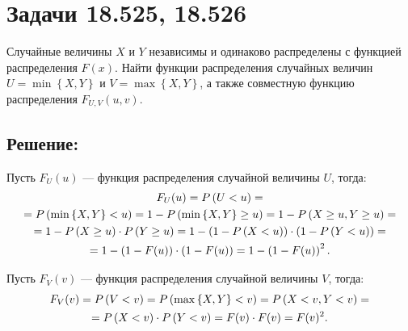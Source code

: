 \section*{Задачи 18.525, 18.526}

Случайные величины $X$ и $Y$ независимы и одинаково распределены с функцией распределения $F(x)$. Найти функции распределения случайных величин $U = \min \left \{ X, Y \right \}$
и $V = \max \left \{ X, Y \right \}$, а также совместную функцию распределения $F_{U,V}(u,v)$.

\subsection*{Решение:}

Пусть $F_U(u)$ --- функция распределения случайной величины $U$, тогда:
\begin{multline}
    F_U(u)
    = P \left ( U < u \right ) = \\
    = P \left ( \min \left \{ X, Y \right \} < u \right )
    = 1 - P \left ( \min \left \{ X, Y \right \} \ge u \right )
    = 1 - P \left ( X \ge u, Y \ge u \right ) = \\
    = 1 - P \left ( X \ge u \right ) \cdot P \left ( Y \ge u \right )
    = 1 - \left ( 1 - P \left ( X < u \right ) \right ) \cdot \left ( 1 - P \left ( Y < u \right ) \right ) = \\
    = 1 - \left ( 1 - F(u) \right ) \cdot \left ( 1 - F(u) \right )
    = 1 - \left ( 1 - F(u) \right )^2.
\end{multline}

Пусть $F_V(v)$ --- функция распределения случайной величины $V$, тогда:
\begin{multline*}
    F_V(v)
    = P \left ( V < v \right )
    = P \left ( \max \left \{ X, Y \right \} < v \right )
    = P \left ( X < v, Y < v \right ) = \\
    = P \left ( X < v \right ) \cdot P \left ( Y < v \right )
    = F(v) \cdot F(v)
    = F(v)^2 .
\end{multline*}

